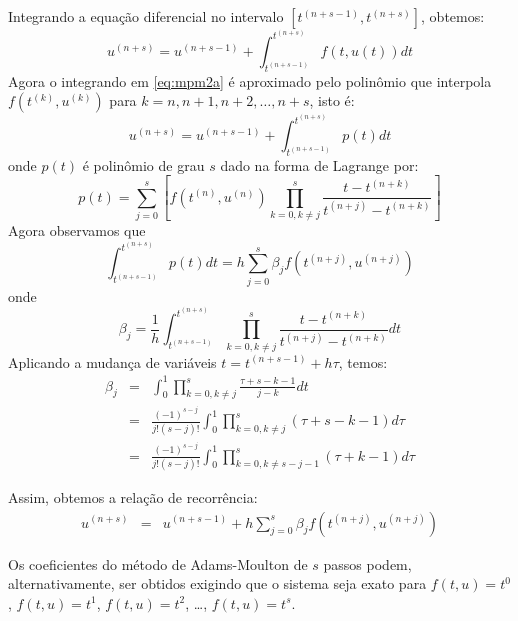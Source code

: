 Integrando a equação diferencial no intervalo $[t^{(n+s-1)},t^{(n+s)}]$, obtemos:
\begin{equation}\label{eq:mpm2a}
  u^{(n+s)}  = u^{(n+s-1)}  + \int_{t^{(n+s-1)}}^{t^{(n+s)}} f(t,u(t)) dt
\end{equation}
 Agora o integrando em \eqref{eq:mpm2a} é aproximado pelo polinômio que interpola $f(t^{(k)},u^{(k)})$ para $k = n, n+1, n+2, \ldots, n+s$, isto é:
\begin{equation}\label{eq:mpm2b}
  u^{(n+s)} = u^{(n+s-1)}  + \int_{t^{(n+s-1)}}^{t^{(n+s)}} p(t) dt
\end{equation}
onde $p(t)$ é polinômio de grau $s$ dado na forma de Lagrange por:
\begin{equation} p(t)=\sum_{j=0}^{s}\left[f(t^{(n)},u^{(n)}) \prod_{k=0,k\neq j}^{s} \frac{t-t^{(n+k)}}{t^{(n+j)}-t^{(n+k)}}\right] \end{equation}
Agora observamos que
\begin{equation} \int _{t^{(n+s-1)}}^{t^{(n+s)}} p(t) dt=h\sum_{j=0}^{s}\beta_j f(t^{(n+j)},u^{(n+j)}) \end{equation}
onde
\begin{equation}
\beta_j= \frac{1}{h}\int_{t^{(n+s-1)}}^{t^{(n+s)}} \prod_{k=0,k\neq j}^{s} \frac{t-t^{(n+k)}}{t^{(n+j)}-t^{(n+k)}}dt
\end{equation}
Aplicando a mudança de variáveis $t=t^{(n+s-1)}+h\tau$, temos:
\begin{eqnarray}\label{eq:betaj_m}
\beta_j&=& \int_0^1 \prod_{k=0,k\neq j}^{s} \frac{\tau+s-k-1}{j-k}dt\\
&=& \frac{(-1)^{s-j}}{j!(s-j)!}\int_{0}^{1} \prod_{k=0,k\neq j}^{s}(\tau+s-k-1)d\tau\\
&=& \frac{(-1)^{s-j}}{j!(s-j)!}\int_{0}^{1} \prod_{k=0,k\neq s-j-1}^{s}(\tau+k-1)d\tau
\end{eqnarray}

Assim, obtemos a relação de recorrência:
\begin{eqnarray}\label{eq:mam}
  u^{(n+s)}  &=& u^{(n+s-1)}  + h\sum_{j=0}^{s}\beta_j f(t^{(n+j)},u^{(n+j)})
\end{eqnarray}


\begin{obs} Os coeficientes do método de Adams-Moulton de $s$ passos podem, alternativamente, ser obtidos exigindo que o sistema seja exato para $f(t,u)=t^0$, $f(t,u)=t^1$, $f(t,u)=t^2$, \ldots, $f(t,u)=t^{s}$.

\end{obs}


